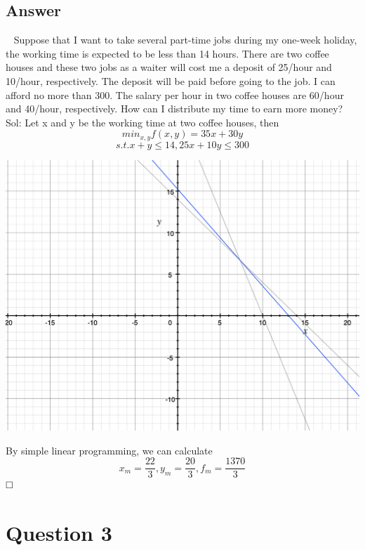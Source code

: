 \documentclass[
	12pt, %
]{fphw}
\begin{document}

\subsection*{Answer}
\ 
\newline
\noindent Suppose that I want to take several part-time jobs during my one-week holiday, the working time is expected to be less than 14 hours. There are two coffee houses and these two jobs as a waiter will cost me a deposit of 25/hour and 10/hour, respectively. The deposit will be paid before going to the job. I can afford no more than 300. The salary per hour in two coffee houses are 60/hour and 40/hour, respectively. How can I distribute my time to earn more money?\\

Sol: Let x and y be the working time at two coffee houses, then 
$$min_{x,y} f(x,y)=35x+30y$$
$$s.t. x+y \leq 14,25x+10y \leq 300$$

\includegraphics[scale=0.6]{op.png}

By simple linear programming, we can calculate $$x_m=\frac{22}{3}, y_m=\frac{20}{3}, f_m=\frac{1370}{3}$$
$\hfill \square$

\section*{Question 3}
\end{document}
